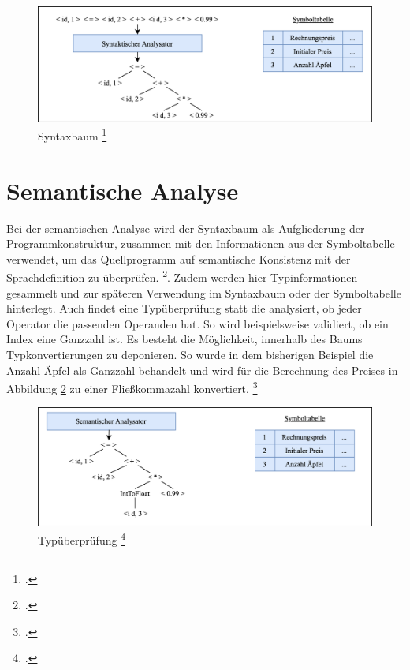\begin{figure}[!ht]
 \includegraphics[width=\textwidth,keepaspectratio]{Images/Compiler/ParserResult.png}
 \caption[Syntaxbaum]{Syntaxbaum \protect\footcite{Ullmann2008} }
 \label{fig:ParserResult}
\end{figure}
\section{Semantische Analyse}

Bei der semantischen Analyse wird der Syntaxbaum    als Aufgliederung der Programmkonstruktur,  zusammen mit den Informationen aus der Symboltabelle verwendet,  um das Quellprogramm auf semantische Konsistenz mit der Sprachdefinition zu überprüfen. \footcite[Vgl.][S. 157]{Wilhelm2012}.  Zudem werden hier Typinformationen gesammelt und zur späteren Verwendung im Syntaxbaum oder der Symboltabelle hinterlegt.  Auch findet eine Typüberprüfung statt die analysiert, ob jeder Operator die passenden Operanden hat.  So wird beispielsweise validiert,  ob ein Index eine Ganzzahl ist.  Es besteht die Möglichkeit, innerhalb des Baums Typkonvertierungen zu deponieren.  So wurde in dem bisherigen Beispiel die Anzahl Äpfel als Ganzzahl behandelt und wird für die Berechnung des Preises in Abbildung \ref{fig:Typ} zu einer Fließkommazahl konvertiert. \footcite[Vgl.][S. 9ff]{Ullmann2008}

\begin{figure}[!ht]
 \includegraphics[width=\textwidth,keepaspectratio]{Images/Compiler/Type.png}
 \caption[Typüberprüfung]{Typüberprüfung \protect\footcite{Ullmann2008} }
 \label{fig:Typ}
\end{figure}

